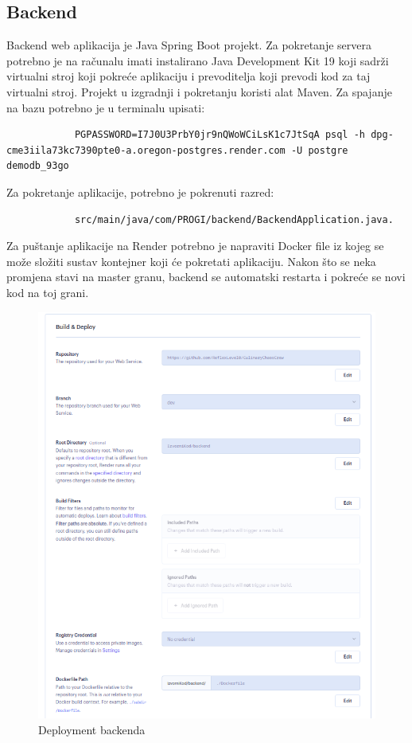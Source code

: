 			\subsection*{Backend}
			Backend web aplikacija je Java Spring Boot projekt. Za pokretanje servera potrebno je na računalu imati instalirano Java Development Kit 19 koji sadrži virtualni stroj koji pokreće aplikaciju i prevoditelja koji prevodi kod za taj virtualni stroj. Projekt u izgradnji i pokretanju koristi alat Maven. Za spajanje na bazu potrebno je u terminalu upisati:
			\begin{verbatim}
			PGPASSWORD=I7J0U3PrbY0jr9nQWoWCiLsK1c7JtSqA psql -h dpg-cme3iila73kc7390pte0-a.oregon-postgres.render.com -U postgre demodb_93go
			\end{verbatim}
			Za pokretanje aplikacije, potrebno je pokrenuti razred:
			\begin{verbatim}
			src/main/java/com/PROGI/backend/BackendApplication.java.
			\end{verbatim}
			Za puštanje aplikacije na Render potrebno je napraviti Docker file iz kojeg se može složiti sustav kontejner koji će pokretati aplikaciju. Nakon što se neka promjena stavi na master granu, backend se automatski restarta i pokreće se novi kod na toj grani.
			\begin{figure}[H]
				\centering
				\includegraphics[width=1\textwidth]{slike/backend.png}
				\caption{Deployment backenda}
				\label{fig:backend-deployment}
			\end{figure}
			
